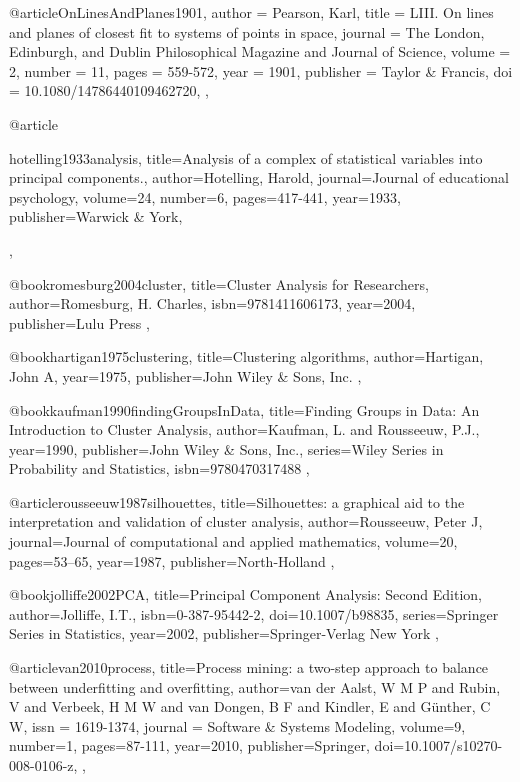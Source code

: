 @article{OnLinesAndPlanes1901,
author = {Pearson, Karl},
title = {LIII. On lines and planes of closest fit to systems of points in space},
journal = {The London, Edinburgh, and Dublin Philosophical Magazine and Journal of Science},
volume = {2},
number = {11},
pages = {559-572},
year  = {1901},
publisher = {Taylor & Francis},
doi = {10.1080/14786440109462720},
},

@article{hotelling1933analysis,
  title={Analysis of a complex of statistical variables into principal components.},
  author={Hotelling, Harold},
  journal={Journal of educational psychology},
  volume={24},
  number={6},
  pages={417-441},
  year={1933},
  publisher={Warwick \& York},

},

@book{romesburg2004cluster,
  title={Cluster Analysis for Researchers},
  author={Romesburg, H. Charles},
  isbn={9781411606173},
  year={2004},
  publisher={Lulu Press}
},

@book{hartigan1975clustering,
  title={Clustering algorithms},
  author={Hartigan, John A},
  year={1975},
  publisher={John Wiley \& Sons, Inc.}
},

@book{kaufman1990findingGroupsInData,
  title={Finding Groups in Data: An Introduction to Cluster Analysis},
  author={Kaufman, L. and Rousseeuw, P.J.},
  year={1990},
  publisher={John Wiley \& Sons, Inc.},
  series={Wiley Series in Probability and Statistics},
  isbn={9780470317488}
},

@article{rousseeuw1987silhouettes,
  title={Silhouettes: a graphical aid to the interpretation and validation of cluster analysis},
  author={Rousseeuw, Peter J},
  journal={Journal of computational and applied mathematics},
  volume={20},
  pages={53--65},
  year={1987},
  publisher={North-Holland}
},

@book{jolliffe2002PCA,
  title={Principal Component Analysis: Second Edition},
  author={Jolliffe, I.T.},
  isbn={0-387-95442-2},
  doi={10.1007/b98835},
  series={Springer Series in Statistics},
  year={2002},
  publisher={Springer-Verlag New York}
},

@article{van2010process,
  title={Process mining: a two-step approach to balance between underfitting and overfitting},
  author={van der Aalst, W M P and Rubin, V and Verbeek, H M W and van Dongen, B F and Kindler, E and G{\"{u}}nther, C W},
  issn = {1619-1374},
journal = {Software {\&} Systems Modeling},
  volume={9},
  number={1},
  pages={87-111},
  year={2010},
  publisher={Springer},
  doi={10.1007/s10270-008-0106-z},
},


